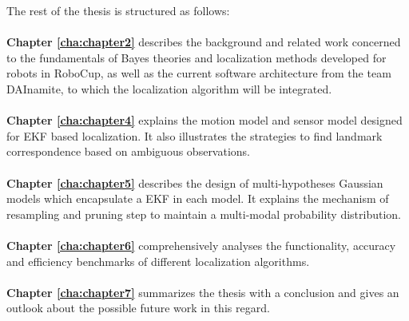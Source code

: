 The rest of the thesis is structured as follows:
\\
\\
\textbf{Chapter \ref{cha:chapter2}} describes the background and related work concerned to the fundamentals of Bayes theories and localization methods developed for robots in RoboCup, as well as the current software architecture from the team DAInamite, to which the localization algorithm will be integrated. 
\\
\\
\textbf{Chapter \ref{cha:chapter4}} explains the motion model and sensor model designed for \gls{EKF} based localization. It also illustrates the strategies to find landmark correspondence based on ambiguous observations. 
\\
\\
\textbf{Chapter \ref{cha:chapter5}} describes the design of multi-hypotheses Gaussian models which encapsulate a \gls{EKF} in each model. It explains the mechanism of resampling and pruning step to maintain a multi-modal probability distribution.
\\
\\
\textbf{Chapter \ref{cha:chapter6}} comprehensively analyses the functionality, accuracy and efficiency benchmarks of different localization algorithms.
\\
\\
\textbf{Chapter \ref{cha:chapter7}} summarizes the thesis with a conclusion and gives an outlook about the possible future work in this regard.
\\
\\
